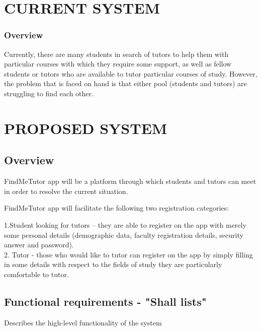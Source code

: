 \documentclass[12pt]{article}
\begin{document}
\section{CURRENT SYSTEM}
\subsubsection{Overview}
\begin{flushleft}
Currently, there are many students in search of tutors to help them with particular courses with which they require some support, as well as fellow students or tutors who are available to tutor particular courses of study. However, the problem that is faced on hand is that either pool (students and tutors) are struggling to find each other. 
\end{flushleft}

\section{PROPOSED SYSTEM}
\subsection{Overview}
\begin{flushleft}
FindMeTutor app will be a platform through which students and tutors can meet in order to resolve the current situation. 
\end{flushleft}
\begin{flushleft}
FindMeTutor app will facilitate the following two registration categories: 

\begin{flushleft}
1.Student looking for tutors – they are able to  register on the app with merely some personal details (demographic data, faculty registration details, security answer and password).\\
2. Tutor - those who would like to tutor can register on the app by simply filling in some details with respect to the fields of study they are particularly comfortable to tutor.\\
\end{flushleft}
\end{flushleft}
\subsection{Functional requirements - "Shall lists"}

Describes the high-level functionality of the system\\
\end{document}
